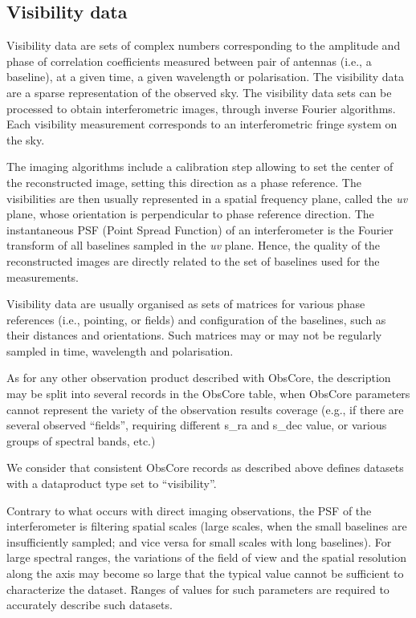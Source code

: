 \documentclass[11pt,a4paper]{ivoa}
\begin{document}
\subsection{Visibility data }
\label{sec:visibility}

Visibility data are sets of complex numbers corresponding to the amplitude and phase
of correlation coefficients measured between pair of antennas (i.e., a baseline), at
a given time, a given wavelength or polarisation. The visibility data are a sparse
representation of the observed sky. The visibility data sets can be processed to obtain
interferometric images, through inverse Fourier algorithms. Each visibility measurement
corresponds to an interferometric fringe system on the sky.

The imaging algorithms include a calibration step allowing to set the center of the
reconstructed image, setting this direction as a phase reference. The visibilities
are then usually represented in a spatial frequency plane, called the \emph{uv} plane,
whose orientation is perpendicular to phase reference direction. The instantaneous PSF
(Point Spread Function) of an interferometer is the Fourier transform of all baselines
sampled in the \emph{uv} plane. Hence, the quality of the reconstructed images are
directly related to the set of baselines used for the measurements.

Visibility data are usually organised as sets of matrices for various phase references
(i.e., pointing, or fields) and configuration of the baselines, such as their
distances and orientations. Such matrices may or may not be regularly sampled in time,
wavelength and polarisation.

As for any other observation product described with ObsCore, the description may be split into
several records in the ObsCore table, when ObsCore parameters cannot represent the
variety of the observation results coverage (e.g., if there are several observed ``fields'',
requiring different s\_ra and s\_dec value, or various groups of spectral bands, etc.)

We consider that consistent ObsCore records as described above defines datasets with
a dataproduct type set to ``visibility''.


Contrary to what occurs with direct imaging observations, the PSF of the interferometer
is filtering spatial scales (large scales, when the small baselines are insufficiently
sampled; and vice versa for small scales with long baselines).
For large spectral ranges, the variations of the field of view and the spatial resolution
along the axis may become so large that the typical value cannot be sufficient to
characterize the dataset. Ranges of values for such parameters are required to accurately
describe such datasets.
\end{document}

